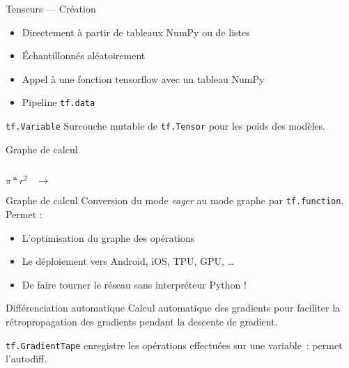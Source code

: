 \begin{frame}{Tenseurs --- Création}
  \begin{itemize}[<+->]
    \item Directement à partir de tableaux NumPy ou de listes
    \item Échantillonnés aléatoirement
    \item Appel à une fonction tensorflow avec un tableau NumPy
    \item Pipeline \texttt{tf.data}
  \end{itemize}
\end{frame}

\begin{frame}{\texttt{tf.Variable}}
  Surcouche mutable de \texttt{tf.Tensor} pour les poids des modèles.
\end{frame}

\begin{frame}{Graphe de calcul}
  \begin{minipage}[l]{0.15\linewidth}
      $\;$
  \end{minipage}\hfill
  \begin{minipage}[l]{0.35\linewidth}
    \huge
    \begin{center}
      $\pi*r^2\;\;\;\rightarrow$
    \end{center}
  \end{minipage}\hfill
  \begin{minipage}[l]{0.49\linewidth}
  \end{minipage}\hfill
\end{frame}

\begin{frame}{Graphe de calcul}
  Conversion du mode \textit{eager} au mode graphe par \texttt{tf.function}. Permet :

  \begin{itemize}[<+->]
    \item L'optimisation du graphe des opérations
    \item Le déploiement vers Android, iOS, TPU, GPU, …
    \item De faire tourner le réseau sans interpréteur Python !
  \end{itemize}
\end{frame}

\begin{frame}{Différenciation automatique}
  Calcul automatique des gradients pour faciliter la rétropropagation des gradients pendant la descente de gradient.

  \texttt{tf.GradientTape} enregistre les opérations effectuées sur une variable~: permet l'autodiff.
\end{frame}

